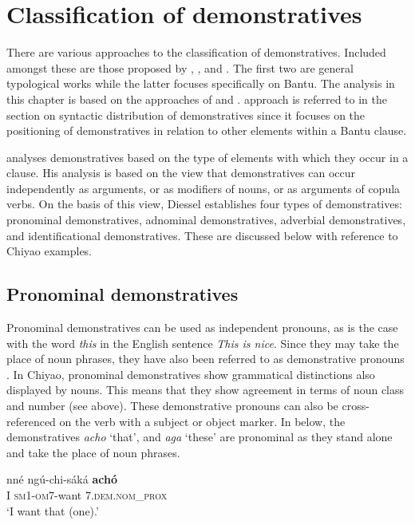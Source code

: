 \documentclass[output=paper,
            colorlinks, citecolor=brown
            ,draftmode
		  ]{langscibook}
\begin{document}
\section{Classification of demonstratives}\label{sec:taji:4}

There are various approaches to the classification of demonstratives. Included amongst these are those proposed by \citet{Diessel1999morphosyntax}, \citet{Dixon2003}, and \citet{VandeVelde2005}. The first two are general typological works while the latter focuses specifically on Bantu. The analysis in this chapter is based on the approaches of \citet{Diessel1999morphosyntax} and \citet{Dixon2003}.  approach is referred to in the section on syntactic distribution of demonstratives since it focuses on the positioning of demonstratives in relation to other elements within a Bantu clause. 

\citet{Diessel1999morphosyntax} analyses demonstratives based on the type of elements with which they occur in a clause. His analysis is based on the view that demonstratives can occur independently as arguments, or as modifiers of nouns, or as arguments of copula verbs. On the basis of this view, Diessel establishes four types of demonstratives: pronominal demonstratives, adnominal demonstratives, adverbial demonstratives, and identificational demonstratives. These are discussed below with reference to Chiyao examples.   

\subsection{Pronominal demonstratives}\label{sec:taji:4.1}

Pronominal demonstratives can be used as independent pronouns, as is the case with the word \textit{this} in the English sentence \textit{This is nice}. Since they may take the place of noun phrases, they have also been referred to as demonstrative pronouns \citep[72]{Diessel1999morphosyntax}. In Chiyao, pronominal demonstratives show grammatical distinctions also displayed by nouns. This means that they show agreement in terms of noun class and number (see  above). These demonstrative pronouns can also be cross-referenced on the verb with a subject or object marker. In  below, the demonstratives \textit{acho} ‘that’, and \textit{aga} ‘these’ are pronominal as they stand alone and take the place of noun phrases. 

\ea%
    \label{ex:taji:12}
    \ea\label{ex:taji:12a}\gll  nné    ngú-chi-sáká          \textbf{achó}\\
      I          \textsc{sm1-om7}-want    7.\textsc{dem.nom\_prox}\\
      \glt ‘I want that (one).’
\end{document}
